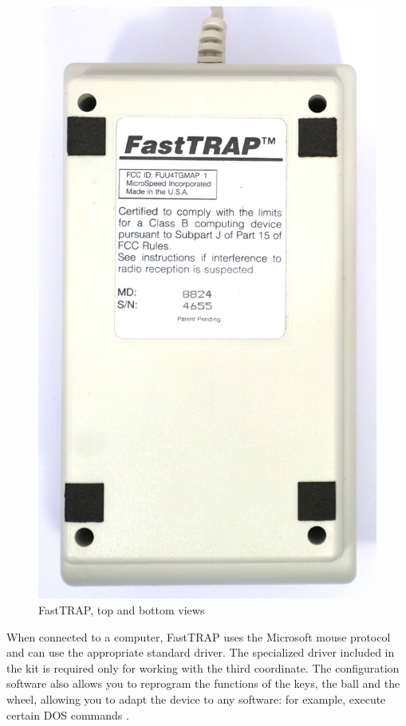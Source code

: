 \documentclass[11pt, a4paper]{article}
\begin{document}
\begin{figure}[h]
    \includegraphics[scale=0.3]{1987_microspeed_fasttrap/bottom_60.jpg}
    \caption{FastTRAP, top and bottom views}
    \label{fig:FastTRAPTop}
\end{figure}

When connected to a computer, FastTRAP uses the Microsoft mouse protocol and can use the appropriate standard driver. The specialized driver included in the kit is required only for working with the third coordinate. The configuration software also allows you to reprogram the functions of the keys, the ball and the wheel, allowing you to adapt the device to any software: for example, execute certain DOS commands \cite{fast}.
\end{document}

